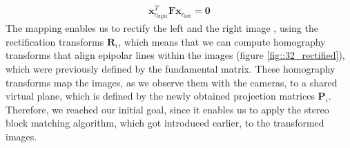 \begin{align}
	\bm{x}_{c_\text{right}}^T\bm{F}\bm{x}_{c_\text{left}} = \bm{0}
\end{align}
The mapping enables us to rectify the left and the right image \cite{loop1999computing}, using the rectification transforms $\bm{R}_i$, which means that we can compute homography transforms that align epipolar lines within the images (figure \ref{fig::32_rectified}), which were previously defined by the fundamental matrix. These homography transforms map the images, as we observe them with the cameras, to a shared virtual plane, which is defined by the newly obtained projection matrices $\bm{P}_i$. Therefore, we reached our initial goal, since it enables us to apply the stereo block matching algorithm, which got introduced earlier, to the transformed images.